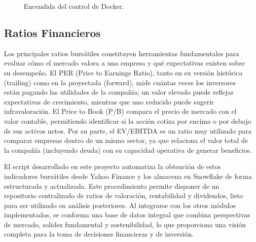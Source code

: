 \documentclass[letterpaper,10pt,spanish]{sphinxmanual}
\begin{document}
\begin{figure}[htbp]
\centering
\capstart

\noindent{}
\caption{ Encendida del control de Docker.}\label{\detokenize{DatosPreparacion:id6}}\end{figure}


\subsection{Ratios Financieros}
\label{\detokenize{DatosPreparacion:ratios-financieros}}
\sphinxAtStartPar
Los principales ratios bursátiles  constituyen herramientas fundamentales para evaluar cómo el mercado valora a una empresa y qué expectativas existen sobre su desempeño. El PER (Price to Earnings Ratio), tanto en su versión histórica (trailing) como en la proyectada (forward), mide cuántas veces los inversores están pagando las utilidades de la compañía; un valor elevado puede reflejar expectativas de crecimiento, mientras que uno reducido puede sugerir infravaloración. El Price to Book (P/B) compara el precio de mercado con el valor contable, permitiendo identificar si la acción cotiza por encima o por debajo de sus activos netos. Por su parte, el EV/EBITDA es un ratio muy utilizado para comparar empresas dentro de un mismo sector, ya que relaciona el valor total de la compañía (incluyendo deuda) con su capacidad operativa de generar beneficios.

\sphinxAtStartPar
El script desarrollado en este proyecto automatiza la obtención de estos indicadores bursátiles desde Yahoo Finance y los almacena en Snowflake de forma estructurada y actualizada. Este procedimiento permite disponer de un repositorio centralizado de ratios de valoración, rentabilidad y dividendos, listo para ser utilizado en análisis posteriores. Al integrarse con los otros módulos implementados, se conforma una base de datos integral que combina perspectivas de mercado, solidez fundamental y sostenibilidad, lo que proporciona una visión completa para la toma de decisiones financieras y de inversión.
\end{document}
